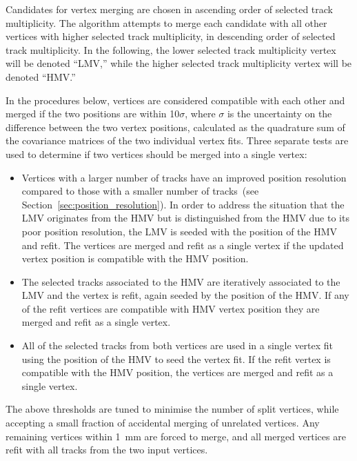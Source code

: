 \documentclass[PUB,UKenglish, texlive=2018]{\ATLASLATEXPATH atlasdoc}
\begin{document}
Candidates for vertex merging are chosen in ascending order of selected track multiplicity. 
The algorithm attempts to merge each candidate with all other vertices with higher selected track multiplicity, in descending order of selected track multiplicity. 
In the following, the lower selected track multiplicity vertex will be denoted ``LMV,'' while the higher selected track multiplicity vertex will be denoted ``HMV.''

In the procedures below, vertices are considered compatible with each other and merged if the two positions are within 10$\sigma$,
where $\sigma$ is the uncertainty on the difference between the two vertex positions,
calculated as the quadrature sum of the covariance matrices of the two individual vertex fits.  
Three separate tests are used to determine if two vertices should be merged into a single vertex:

\begin{itemize}
\item{Vertices with a larger number of tracks have an improved position resolution compared to those with a smaller number of tracks~(see Section~\ref{sec:position_resolution}).
         In order to address the situation that the LMV originates from the HMV but is distinguished from the HMV due to its poor position resolution, the LMV is seeded with the position of the HMV and refit. 
         The vertices are merged and refit as a single vertex if the updated vertex position is compatible with the HMV position.}
\item{The selected tracks associated to the HMV are iteratively associated to the LMV and the vertex is refit, again seeded by the position of the HMV. 
         If any of the refit vertices are compatible with HMV vertex position they are merged and refit as a single vertex.}
\item{All of the selected tracks from both vertices are used in a single vertex fit using the position of the HMV to seed the vertex fit.  
         If the refit vertex is compatible with the HMV position, the vertices are merged and refit as a single vertex.}
\end{itemize}

The above thresholds are tuned to minimise the number of split vertices, while accepting a small fraction of accidental merging of unrelated vertices. 
Any remaining vertices within 1~mm are forced to merge, and all merged vertices are refit with all tracks from the two input vertices.

\end{document}
